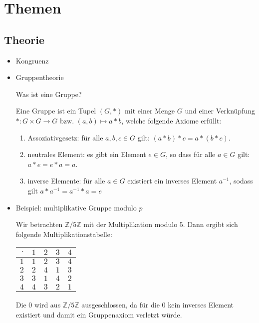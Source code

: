 \documentclass[
  a4paper,
  11pt,
]{article}
\title{}
\author{}
\newcommand{\Z}{\mathbb{Z}}
\begin{document}
\section*{Themen}
\label{sec:Themen}

\subsection*{Theorie}
\label{sub:Theorie}

\begin{itemize}
  \item Kongruenz

  \item Gruppentheorie

    Was ist eine Gruppe?

      Eine Gruppe ist ein Tupel $(G, *)$ mit einer Menge $G$ und einer
      Verknüpfung $*: G \times G \to G$ bzw. $(a, b) \mapsto a * b$, welche
      folgende Axiome erfüllt:
      \begin{enumerate}
        \item Assoziativgesetz: für alle $a,b,c \in G$ gilt: $(a * b) * c = a
          * (b * c)$.
        \item neutrales Element: es gibt ein Element $e \in G$, so dass für
          alle $a \in G$ gilt: $a * e = e * a = a$.
        \item inverse Elemente: für alle $a \in G$ existiert ein inverses
          Element $a^{-1}$, sodass gilt $a * a^{-1} = a^{-1} * a = e$
      \end{enumerate}

  \item Beispiel: multiplikative Gruppe modulo $p$

    Wir betrachten $\Z/5\Z$ mit der Multiplikation modulo $5$. Dann ergibt sich
    folgende Multiplikationstabelle:
    \begin{center}
      \begin{tabular}{r|cccc}
        $\cdot$ & $1$ & $2$ & $3$ & $4$\\\hline
          $1$   & $1$ & $2$ & $3$ & $4$\\
          $2$   & $2$ & $4$ & $1$ & $3$\\
          $3$   & $3$ & $1$ & $4$ & $2$\\
          $4$   & $4$ & $3$ & $2$ & $1$
      \end{tabular}
    \end{center}
    Die $0$ wird aus $\Z/5\Z$ ausgeschlossen, da für die $0$ kein inverses
    Element existiert und damit ein Gruppenaxiom verletzt würde.


\end{itemize}
\end{document}

